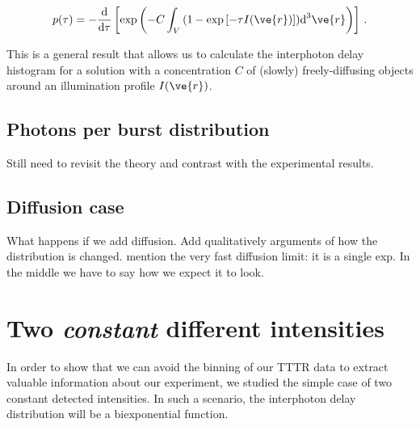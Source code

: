 \begin{equation}
p(\tau)=-\frac{\mbox{d}}{\mbox{d}\tau}\left[ \exp\left(-C \int_V{\left(1-\exp\left[-\tau I(\ve{r})\right] \right)}\mbox{d}^3\ve{r}    \right)\right]\,.
\label{eq:result}
\end{equation}

This is a general result that allows us to calculate the interphoton delay histogram for a solution 
with a concentration $C$ of (slowly) freely-diffusing objects around an illumination profile $I(\ve{r})$. 

\subsection{Photons per burst distribution}

Still need to revisit the theory and contrast with the experimental results.

\subsection{Diffusion case}

What happens if we add diffusion. Add qualitatively arguments of how the distribution is changed. mention the very fast
diffusion limit: it is a single exp. In the middle we have to say how we expect it to look.




\section{Two \textit{constant} different intensities}

In order to show that we can avoid the binning of our TTTR data to extract valuable information about our experiment, we studied the simple case of two constant detected intensities. In such a scenario, the interphoton delay distribution will be a biexponential function.

